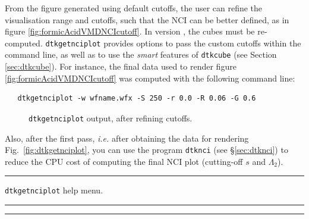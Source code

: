 From the figure generated using default cutoffs, the user can refine the visualisation range and
cutoffs, such that the NCI can be better defined, as in figure \ref{fig:formicAcidVMDNCIcutoff}.
In version \dtkversion, the cubes must be re-computed.
\texttt{dtkgetnciplot} provides options to pass the custom cutoffs within the command line, as well
as to use the \textit{smart} features of \texttt{dtkcube} (see Section \ref{sec:dtkcube}).
For instance, the final data used to render figure \ref{fig:formicAcidVMDNCIcutoff} was
computed with the following command line:
%
\begin{lstlisting}
   dtkgetnciplot -w wfname.wfx -S 250 -r 0.0 -R 0.06 -G 0.6
\end{lstlisting}
%
\begin{figure}[hbt!]
\centering
{}\quad
{}
\caption{\texttt{dtkgetnciplot} output, after refining cutoffs.}\label{fig:dtkgetnciplotCutoff}
\end{figure}
%

Also, after the first pass, \textit{i.e.} after obtaining the data for rendering
Fig.~\ref{fig:dtkgetnciplot}, you can use the program \texttt{dtknci} (see \S\ref{sec:dtknci})
to reduce the CPU cost of computing the final NCI plot (cutting-off $s$ and $\Lambda_2$).

\newpage
\rule{\textwidth}{1pt}
{\center\texttt{dtkgetnciplot} help menu.\\}
\rule{\textwidth}{1pt}
\begin{footnotesize}
\end{footnotesize}
\rule{\textwidth}{1pt}
